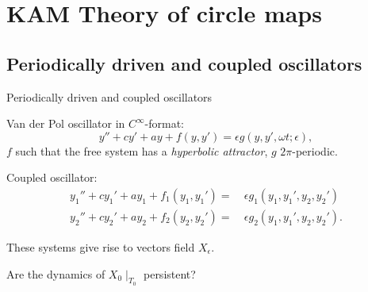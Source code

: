 \documentclass[]{beamer}
\newcommand{\e}{\epsilon}
\newcommand{\om}{\omega}
\newcommand{\T}{\mathbb{T}}
\newcommand{\rst}{\! \mid}
\begin{document}
\section{KAM Theory of circle maps}

\subsection{Periodically driven and coupled oscillators}

\begin{frame}{Periodically driven and coupled oscillators}
    
    Van der Pol oscillator in $C^\infty$-format:
    \begin{equation*}
        y'' + cy' + ay + f(y,y') = \epsilon g(y,y',\omega t; \epsilon),
    \end{equation*}
    \pause
    $f$ such that the free system has a \emph{hyperbolic attractor}, $g$ $2\pi$-periodic.
    
    \medskip
    Coupled oscillator:
    \begin{align*}
        y_1'' + cy_1' + ay_1 + f_1(y_1,y_1') = & \ \e g_1(y_1,y_1',y_2,y_2') \\
	y_2'' + cy_2' + ay_2 + f_2(y_2,y_2') = & \ \e g_2(y_1,y_1',y_2,y_2').
    \end{align*}

    \pause
    
    These systems give rise to vectors field $X_\e$.
    
    \pause
    \begin{center}
        \large
        Are the dynamics of $X_0 \rst_{T_0}$ persistent?
    \end{center}
    
    
\end{frame}

%     
%     
%     
% 
\end{document}
